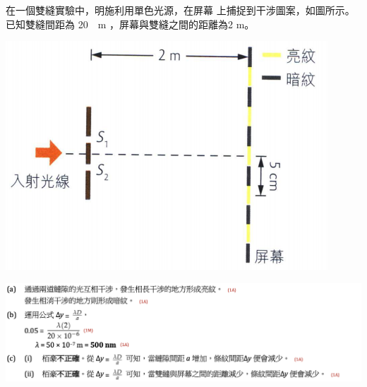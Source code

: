 {
    在一個雙縫實驗中，明施利用單色光源，在屏幕 上捕捉到干涉圖案，如圖所示。已知雙縫間距為 \qty{20}{\mu m} ，屏幕與雙縫之間的距離為2 m。
    \par{\par\centering\includegraphics[width=.4\textwidth]{./img/ch4_earlyclass_wave_lq_2024-05-14-14-14-14.png}\par}
    \clearpage
}{
    \sol\par{\par\centering\includegraphics[width=\textwidth]{./img/ch4_earlyclass_wave_lq_2024-05-14-14-16-23.png}\par}
}



